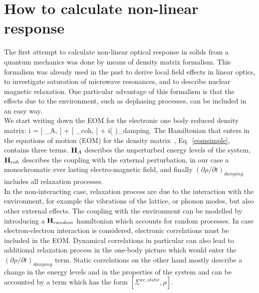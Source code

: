 \section{How to calculate non-linear response}
The first attempt to calculate non-linear optical response in solids from a quantum mechanics was done by means of density matrix formalism.\cite{bloembergen1964quantum} This formalism was already used in the past to derive local field effects in linear optics\cite{PhysRev.126.413,wiser1963dielectric}, to investigate  saturation of microwave resonances\cite{karplus1948note}, and to describe nuclear magnetic relaxation\cite{kubo1954general,RevModPhys.33.249,PhysRev.102.104}.              
One particular advantage of this formalism is that the effects due to the environment, such as dephasing processes, can be included in an easy way.\cite{manzano2020short}\\  
We start writing down the EOM for the electronic one body reduced density matrix:
\be
i \hbar {} = [ \HH_A, \rho] + [ \HH_{coh}, \rho] + i\hbar \left (  \right )_{damping}.
\label{eomsimple}
\ee
The Hamiltonian that enters in the equations of motion (EOM) for the density matrix~\cite{neumann}, Eq.~\ref{eomsimple}, contains three terms. ${\bf H}_A$ describes the unperturbed energy levels of the system, ${\bf H}_{coh}$ describes the coupling with the external perturbation, in our case a monochromatic ever lasting electro-magnetic field, and finally %
$\left ( \partial \rho/\partial t \right )_{damping}$ includes all relaxation processes.\\
In the non-interacting case, relaxation process are due to the interaction with the environment, for example the vibrations of the lattice, or phonon modes, but also other external effects. The coupling with the environment can be modelled by introducing a ${\bf H}_{random}$ hamiltonian which accounts for random processes. 
In case electron-electron interaction is considered, electronic correlations must be included in the EOM. Dynamical correlations in particular can also lead to additional relaxation process in the one-body picture which would enter the $\left ( \partial \rho/\partial t \right )_{damping}$ term. Static correlations on the other hand mostly describe a change in the energy levels and in the properties of the system and can be accounted by a term which has the form $[\Sigma^{xc,static},\rho]$.

